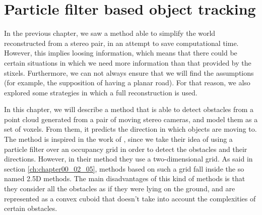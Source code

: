 
\graphicspath{{./images/chapter05/bmps/}{./images/chapter05/vects/}{./images/chapter05/}}

\chapter{Particle filter based object tracking}\label{ch:chapter05}


In the previous chapter, we saw a method able to simplify the world reconstructed from a stereo pair, in an attempt to save computational time. However, this implies loosing information, which means that there could be certain situations in which we need more information than that provided by the stixels. Furthermore, we can not always ensure that we will find the assumptions (for example, the supposition of having a planar road). For that reason, we also explored some strategies in which a full reconstruction is used.

In this chapter, we will describe a method that is able to detect obstacles from a point cloud generated from a pair of moving stereo cameras, and model them as a set of voxels. From them, it predicts the direction in which objects are moving to. The method is inspired in the work of \cite{danescu2012particle}, since we take their idea of using a particle filter over an occupancy grid in order to detect the obstacles and their directions. However, in their method they use a two-dimensional grid. As said in section \ref{ch:chapter00_02_05}, methods based on such a grid fall inside the so named 2.5D methods. The main disadvantages of this kind of methods is that they consider all the obstacles as if they were lying on the ground, and are represented as a convex cuboid that doesn't take into account the complexities of certain obstacles.

